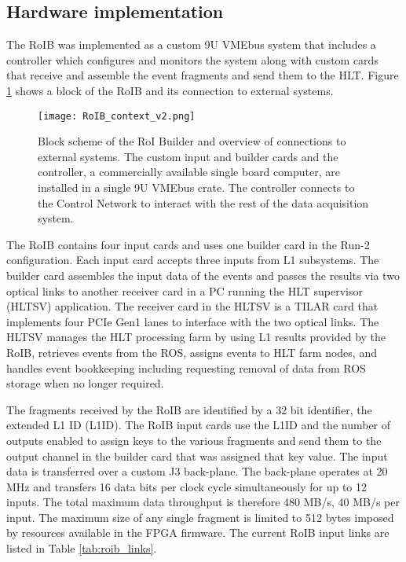 \subsection{Hardware implementation}\label{sec:roib_current}

The RoIB was implemented as a custom 9U VMEbus system that includes a controller which configures and monitors the system along with custom cards 
that receive and assemble the event fragments and send them to the HLT. Figure \ref{roib_run1} shows a block of the RoIB and 
its connection to external systems.

\begin{figure}[tbp] %
\centering
\texttt{[image: RoIB\_context\_v2.png]}
\caption{Block scheme of the RoI Builder and overview of connections to external systems.  The
custom input and builder cards and the controller, a commercially available single board computer,
are installed in a single 9U VMEbus crate. The controller connects to the Control Network to interact with the rest of the 
data acquisition system.}
\label{roib_run1}
\end{figure}

The RoIB contains four input cards and uses one builder card in the Run-2 configuration. Each input card accepts three inputs from 
L1 subsystems. 
The builder card assembles the input data of the events and passes the results via two optical links 
to another receiver card in a PC running the HLT supervisor (HLTSV) application. The receiver card in the HLTSV is a TILAR card \cite{tilar}
 that implements four PCIe Gen1 lanes to interface with the two optical links. The HLTSV manages the HLT processing farm by using L1 results provided by the RoIB, retrieves events from the ROS, assigns events to HLT farm nodes, and handles event bookkeeping including requesting removal of data from ROS storage when no longer required. 

The fragments received by the RoIB are identified by a 32 bit identifier, the extended L1 ID (L1ID). 
The RoIB input cards use the L1ID and the number of outputs enabled to assign keys to the various fragments and send them to the output channel in the builder card that was 
assigned that key value. The input data is transferred over a custom J3 back-plane. The back-plane operates at 20 MHz and transfers 16 data bits per 
clock cycle simultaneously for up to 12 inputs. The total maximum data throughput is therefore 480 MB/s, 40 MB/s per input.  
The maximum size of any single fragment is limited to 512 bytes imposed by resources available in the FPGA firmware. The current RoIB input 
links are listed in Table \ref{tab:roib_links}.

